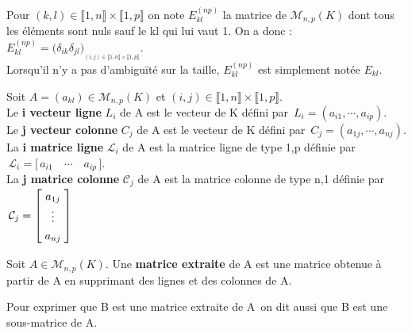 \vspace{1cm}

\noindent Pour \((k,l)\in \llbracket 1,n \rrbracket \times \llbracket 1,p \rrbracket \) on note \(E_{kl}^{(np)}\) la matrice de \(\mathcal{M}_{n,p}(K)\) dont tous les éléments sont nuls sauf le kl qui lui vaut 1. On a donc : \(E_{kl}^{(np)}=\bigl(\delta_{ik}\delta_{jl}\bigr)_{_{(i,j)\in \llbracket 1,n \rrbracket \times \llbracket 1,p \rrbracket}}\).\vspace{0.1cm}\\
Lorsqu'il n'y a pas d'ambiguïté sur la taille, \(E_{kl}^{(np)}\) est simplement notée \(E_{kl}\).

\newpage

Soit \(A=(a_{kl})\in\mathcal{M}_{n,p}(K)\) et \((i,j)\in \llbracket 1,n \rrbracket \times \llbracket 1,p \rrbracket\).\vspace{0.3cm}\\
Le \textbf{i vecteur ligne} \(L_i\) de A est le vecteur de K défini par \(\,L_i=(a_{i1},\cdots,a_{ip}).\)\vspace{0.1cm}\\ 
Le \textbf{j vecteur colonne} \(C_j\) de A est le vecteur de K défini par \(\,C_j=(a_{1j},\cdots,a_{nj}).\)\vspace{0.1cm}\\
La \textbf{i matrice ligne} \(\mathcal{L} _i\) de A est la matrice ligne de type 1,p définie par \(\, \mathcal{L} _i= \bigl[\, a_{i1} \quad \cdots \quad a_{ip}\, \bigr]\).\vspace{0.1cm}\\
La \textbf{j matrice colonne} \(\mathcal{C} _j\) de A est la matrice colonne de type n,1 définie par \(\, \displaystyle \arraycolsep=0.1cm\def\arraystretch{1.3} \mathcal{C} _j=\left[
\begin{array}{c}
    a_{1j} \\
    \vdots \\
    a_{nj}
\end{array} \right]\)

\vspace{1cm}

Soit \(A\in\mathcal{M}_{n,p}(K)\). Une \textbf{matrice extraite} de A est une matrice obtenue à partir de A en supprimant des lignes et des colonnes de A.\vspace{0.1cm}\\
\begin{small}
    Pour exprimer que B est une \guillemetleft matrice extraite de A\guillemetright \ on dit aussi que \guillemetleft B est une sous-matrice de A\guillemetright.
\end{small}

